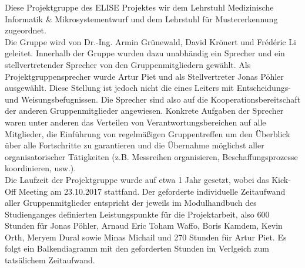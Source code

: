 

Diese Projektgruppe des ELISE Projektes wir dem Lehrstuhl Medizinische Informatik \& Mikrosystementwurf und dem Lehrstuhl für Mustererkennung zugeordnet. \\

Die Gruppe wird von Dr.-Ing. Armin Grünewald, David Krönert und Frédéric Li geleitet. 
Innerhalb der Gruppe wurden dazu unabhändig ein Sprecher und ein stellvertretender Sprecher von den Gruppenmitgliedern gewählt. Als Projektgruppensprecher wurde Artur Piet und als Stellvertreter Jonas Pöhler ausgewählt. 
Diese Stellung ist jedoch nicht die eines Leiters mit Entscheidungs- und Weisungsbefugnissen. Die Sprecher sind also auf die Kooperationsbereitschaft der anderen Gruppenmitglieder angewiesen. 
Konkrete Aufgaben der Sprecher waren unter anderen das Verteilen von Verantwortungsbereichen auf alle Mitglieder, die Einführung von regelmäßigen Gruppentreffen um den Überblick über alle Fortschritte zu garantieren und die Übernahme möglichst aller organisatorischer Tätigkeiten (z.B. Messreihen organisieren, Beschaffungsprozesse koordinieren, usw.). \\

Die Laufzeit der Projektgruppe wurde auf etwa 1 Jahr gesetzt, wobei das Kick-Off Meeting am 23.10.2017 stattfand. Der geforderte individuelle Zeitaufwand aller Gruppenmitglieder entspricht der jeweils im Modulhandbuch des Studienganges definierten Leistungspunkte für die Projektarbeit, also 600 Stunden für Jonas Pöhler, Arnaud Eric Toham Waffo, Boris Kamdem, Kevin Orth, Meryem Dural sowie Minas Michail und 270 Stunden für Artur Piet. Es folgt ein Balkendiagramm mit den geforderten Stunden im Verlgeich zum tatsälichem Zeitaufwand. \\





